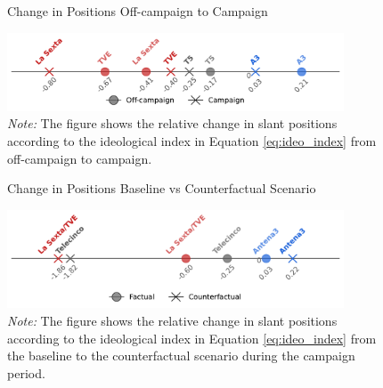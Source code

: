 \documentclass[12pt]{article}
\begin{document}

	
	
	\begin{figure}[!htb]
		\centering
		\caption{Change in Positions Off-campaign to Campaign}
		\includegraphics[width=100mm]{figures/congress_line_chatgpt_pre_postv2}
		
		\caption*{\small \textit{Note:} The figure shows the relative change in  slant positions  according to the ideological index in Equation \eqref{eq:ideo_index} from off-campaign to campaign. 	}%
	\label{fig:change_line}
	\end{figure}
	
	
	
	
	\begin{figure}[!htb]
		\centering
		\caption{Change in Positions Baseline vs Counterfactual Scenario}
		\includegraphics[width=100mm]{figures/congress_line_counter}
		
		\caption*{\small \textit{Note:} The figure shows the relative change in  slant positions  according to the ideological index in Equation \eqref{eq:ideo_index} from the baseline to the counterfactual scenario during the campaign period.}
		\label{fig:change_line_counter}
	\end{figure}
	
\end{document}
